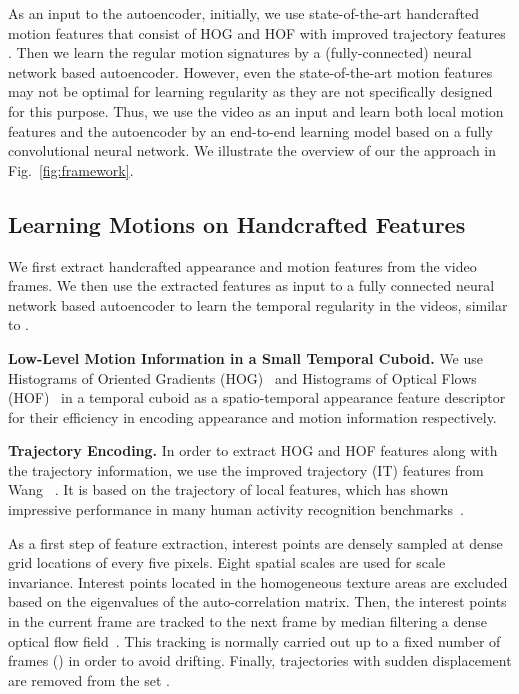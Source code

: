 \documentclass[10pt,twocolumn,letterpaper]{article}
\begin{document}
As an input to the autoencoder, initially, we use state-of-the-art handcrafted motion features that consist of HOG and HOF with improved trajectory features \cite{wang2013action}. Then we learn the regular motion signatures by a (fully-connected) neural network based autoencoder. 
However, even the state-of-the-art motion features may not be optimal for learning regularity as they are not specifically designed for this purpose.
Thus, we use the video as an input and learn both local motion features and the autoencoder by an end-to-end learning model based on a fully convolutional neural network. 
We illustrate the overview of our the approach in Fig.~\ref{fig:framework}.


\subsection{Learning Motions on Handcrafted Features}
\label{sec:local_approach}

We first extract handcrafted appearance and motion features from the video frames. 
We then use the extracted features as input to a fully connected neural network based autoencoder to learn the temporal regularity in the videos, similar to \cite{hinton2006reducing,hasanR14}.

\vspace{.5em}
\noindent \textbf{Low-Level Motion Information in a Small Temporal Cuboid.}
We use Histograms of Oriented Gradients (HOG)~\cite{DT05,laptevMSR08} and Histograms of Optical Flows (HOF)~\cite{dalal2006human} in a temporal cuboid as a spatio-temporal appearance feature descriptor for their efficiency in encoding appearance and motion information respectively. 


\vspace{.5em}
\noindent \textbf{Trajectory Encoding.}
In order to extract HOG and HOF features along with the trajectory information, we use the improved trajectory (IT) features from Wang\etal~ \cite{wang2013action}.
It is based on the trajectory of local features, which has shown impressive performance in many human activity recognition benchmarks~\cite{wang2013action,gaurZSR11}. 

As a first step of feature extraction, interest points are densely sampled at dense grid locations of every five pixels.
Eight spatial scales are used for scale invariance.
Interest points located in the homogeneous texture areas are excluded based on the eigenvalues of the auto-correlation matrix. 
Then, the interest points in the current frame are tracked to the next frame by median filtering a dense optical flow field~\cite{wangKSC11}.
This tracking is normally carried out up to a fixed number of frames () in order to avoid drifting. 
Finally, trajectories with sudden displacement are removed from the set \cite{wang2013action}.
\end{document}
